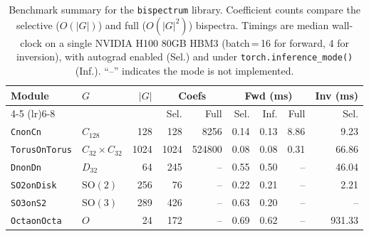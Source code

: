 \begin{table}[t]
    \centering
    \caption{Benchmark summary for the \texttt{bispectrum} library.
    Coefficient counts compare the selective ($O(|G|)$) and full ($O(|G|^2)$) bispectra.
    Timings are median wall-clock on a single NVIDIA H100 80GB HBM3 (batch\,=\,16 for forward, 4 for inversion),
    with autograd enabled (Sel.) and under \texttt{torch.inference\_mode()} (Inf.).
    ``--'' indicates the mode is not implemented.}
    \label{tab:benchmarks}
    \small
    \begin{tabular}{llrrrrrrr}
        \toprule
        Module & $G$ & $|G|$ & \multicolumn{2}{c}{Coefs} & \multicolumn{3}{c}{Fwd (ms)} & Inv (ms) \\
        \cmidrule(lr){4-5} \cmidrule(lr){6-8}
         & & & Sel. & Full & Sel. & Inf. & Full & Sel. \\
        \midrule
        \texttt{CnonCn} & $C_{128}$ & 128 & 128 & 8256 & 0.14 & 0.13 & 8.86 & 9.23 \\
        \texttt{TorusOnTorus} & $C_{32}{\times}C_{32}$ & 1024 & 1024 & 524800 & 0.08 & 0.08 & 0.31 & 66.86 \\
        \texttt{DnonDn} & $D_{32}$ & 64 & 245 & -- & 0.55 & 0.50 & -- & 46.04 \\
        \texttt{SO2onDisk} & $\mathrm{SO}(2)$ & 256 & 76 & -- & 0.22 & 0.21 & -- & 2.21 \\
        \texttt{SO3onS2} & $\mathrm{SO}(3)$ & 289 & 426 & -- & 0.63 & 0.20 & -- & -- \\
        \texttt{OctaonOcta} & $O$ & 24 & 172 & -- & 0.69 & 0.62 & -- & 931.33 \\
        \bottomrule
    \end{tabular}
\end{table}
